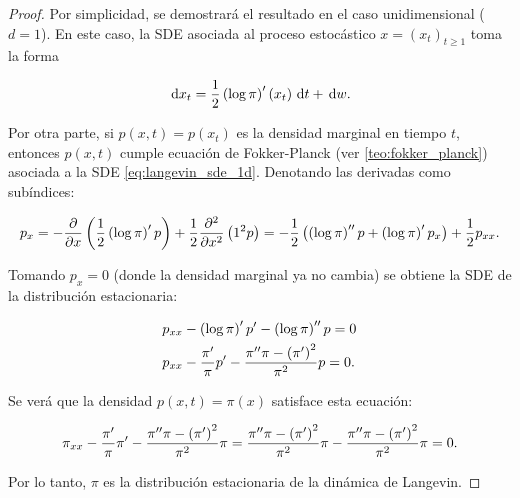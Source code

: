 \begin{proof}
    Por simplicidad, se demostrará el resultado en el caso unidimensional ($d=1$). En este caso, la SDE asociada al proceso estocástico $x=(x_t)_{t\geq 1}$ toma la forma

    \begin{equation}
        \label{eq:langevin_sde_1d}
        \,\operatorname{d}\! x_t = \frac{1}{2}\left(\log \pi\right)'(x_t) \,\operatorname{d}\! t + \,\operatorname{d}\! w .
    \end{equation}
    
    Por otra parte, si $p(x,t)=p(x_t)$ es la densidad marginal en tiempo $t$, entonces $p(x,t)$ cumple ecuación de Fokker-Planck (ver \autoref{teo:fokker_planck}) asociada a la SDE \eqref{eq:langevin_sde_1d}. Denotando las derivadas como subíndices:

    \begin{align*}
        p_x
        = -\frac{\partial}{\partial x} \left(\frac{1}{2}\left(\log \pi\right)' p\right) + \frac{1}{2} \frac{\partial^2}{\partial x^2} \left(1^2 p\right)
        = -\frac{1}{2}\left(\left(\log\pi\right)''p+\left(\log\pi\right)'p_x\right) + \frac{1}{2}p_{xx}.
    \end{align*}

    Tomando $p_x=0$ (donde la densidad marginal ya no cambia) se obtiene la SDE de la distribución estacionaria:

    \begin{align*}
        &p_{xx} - \left(\log\pi\right)'p' - \left(\log\pi\right)'' p = 0\\
        &p_{xx}-\frac{\pi'}{\pi}p' - \frac{\pi''\pi-\left(\pi'\right)^2}{\pi^2}p = 0.
    \end{align*}

    Se verá que la densidad $p(x,t)=\pi(x)$ satisface esta ecuación:

    \begin{equation*}
        \pi_{xx}-\frac{\pi'}{\pi}\pi' - \frac{\pi''\pi-\left(\pi'\right)^2}{\pi^2}\pi
        = \frac{\pi''\pi-\left(\pi'\right)^2}{\pi^2}\pi - \frac{\pi''\pi-\left(\pi'\right)^2}{\pi^2}\pi = 0 .
    \end{equation*}

    Por lo tanto, $\pi$ es la distribución estacionaria de la dinámica de Langevin.
\end{proof}

